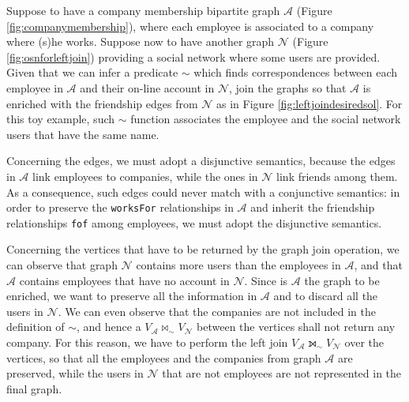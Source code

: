 \begin{example}
	Suppose to have a company membership bipartite graph $\mathcal{A}$ (Figure \ref{fig:companymembership}), where each employee is associated to a company where (s)he works. Suppose now to have another graph $\mathcal{N}$ (Figure \ref{fig:osnforleftjoin}) providing a social network where some users are provided. Given that we can infer a predicate $\sim$ which finds correspondences between each employee in $\mathcal{A}$ and their on-line account in $\mathcal{N}$, join the graphs so that $\mathcal{A}$ is enriched with the friendship edges from $\mathcal{N}$ as in Figure \ref{fig:leftjoindesiredsol}. For this toy example, such $\sim$ function associates the employee and the social network users that have the same name.
	\medskip
	

	Concerning the edges, we must adopt a disjunctive semantics, because the edges in $\mathcal{A}$ link employees to companies, while the ones in $\mathcal{N}$ link friends among them. As a consequence, such edges could never match with a conjunctive semantics: in order to preserve the \texttt{worksFor} relationships in $\mathcal{A}$ and inherit the friendship relationships \texttt{fof} among employees, we must adopt the disjunctive semantics.
	
	Concerning the vertices that have to be returned by the graph join operation, we can observe that graph $\mathcal{N}$ contains more users than the employees in $\mathcal{A}$, and that $\mathcal{A}$ contains employees that have no account in $\mathcal{N}$. Since is $\mathcal{A}$ the graph to be enriched, we want to preserve all the information in $\mathcal{A}$ and to discard all the users in $\mathcal{N}$. We can even observe that the companies are not included in the definition of $\sim$, and hence a $V_{\mathcal{A}}\bowtie_\sim V_{\mathcal{N}}$ between the vertices shall not return any company. For this reason, we have to perform the left join $V_{\mathcal{A}}\leftouterjoin_\sim V_{\mathcal{N}}$ over the vertices, so that all the employees and the companies from graph $\mathcal{A}$ are preserved, while the users in  $\mathcal{N}$ that are not employees are not represented in the final graph. 
\end{example}



